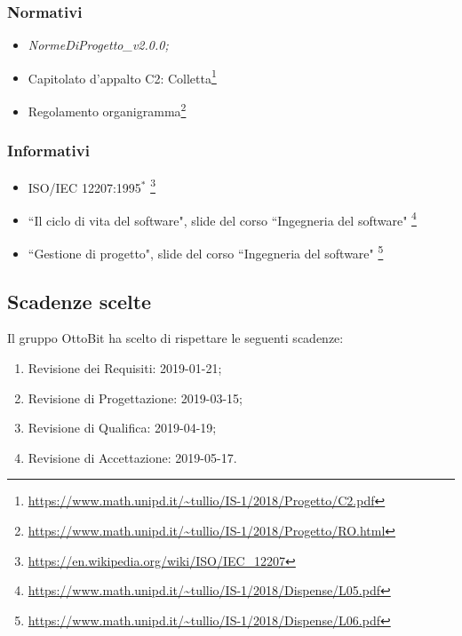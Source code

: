 	\subsubsection{Normativi}
		\begin{itemize}
			\item \textit{NormeDiProgetto\_v2.0.0;}
			\item Capitolato d'appalto C2: Colletta\footnote{\url{https://www.math.unipd.it/~tullio/IS-1/2018/Progetto/C2.pdf}}
			\item Regolamento organigramma\footnote{\url{https://www.math.unipd.it/~tullio/IS-1/2018/Progetto/RO.html}}
		\end{itemize}
	\subsubsection{Informativi}
		\begin{itemize}
			\item ISO/IEC 12207:1995$^*$ \footnote{\url{https://en.wikipedia.org/wiki/ISO/IEC_12207}}
			\item ``Il ciclo di vita del software", slide del corso ``Ingegneria del software" \footnote{\url{https://www.math.unipd.it/~tullio/IS-1/2018/Dispense/L05.pdf}}
			\item ``Gestione di progetto", slide del corso ``Ingegneria del software" \footnote{\url{https://www.math.unipd.it/~tullio/IS-1/2018/Dispense/L06.pdf}}
		\end{itemize}

\subsection{Scadenze scelte}
	Il gruppo OttoBit ha scelto di rispettare le seguenti scadenze:
	\begin{enumerate}
		\item Revisione dei Requisiti: 2019-01-21;
		\item Revisione di Progettazione: 2019-03-15;
		\item Revisione di Qualifica: 2019-04-19;
		\item Revisione di Accettazione: 2019-05-17.
	\end{enumerate}